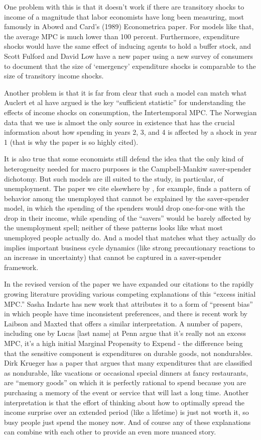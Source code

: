 \documentclass[12pt,letterpaper,english]{article}
\begin{document}
\begin{enumerate}
One problem with this is that it doesn't work if there are transitory shocks to income of a magnitude that labor economists have long been measuring, most famously in Abowd and Card's (1989) Econometrica paper.  For models like that, the average MPC is much lower than 100 percent.  Furthermore, expenditure shocks would have the same effect of inducing agents to hold a buffer stock, and Scott Fulford and David Low have a new paper using a new survey of consumers to document that the size of `emergency' expenditure shocks is comparable to the size of transitory income shocks.

Another problem is that it is far from clear that such a model can match what Auclert et al have argued is the key ``sufficient statistic'' for understanding the effects of income shocks on consumption, the Intertemporal MPC.  The Norwegian data that we use is almost the only source in existence that has the crucial information about how spending in years 2, 3, and 4 is affected by a shock in year 1 (that is why the paper is so highly cited). 

It is also true that some economists still defend the idea that the only kind of heterogeneity needed for macro purposes is the Campbell-Mankiw saver-spender dichotomy. But such models are ill suited to the study, in particular, of unemployment.  The paper we cite elsewhere by , for example, finds a pattern of behavior among the unemployed that cannot be explained by the saver-spender model, in which the spending of the spenders would drop one-for-one with the drop in their income, while spending of the ``savers'' would be barely affected by the unemployment spell; neither of these patterns looks like what most unemployed people actually do.  And a model that matches what they actually do implies important business cycle dynamics (like strong precautionary reactions to an increase in uncertainty) that cannot be captured in a saver-spender framework.

In the revised version of the paper we have expanded our citations to the rapidly growing literature providing various competing explanations of this ``excess initial MPC.'' Sasha Indarte has new work that attributes it to a form of ``present bias'' in which people have time inconsistent preferences, and there is recent work by Laibson and Maxted that offers a similar interpretation. A number of papers, including one by Lucas [last name] at Penn argue that it's really not an excess MPC, it's a high initial Marginal Propensity to Expend - the difference being that the sensitive component is expenditures on durable goods, not nondurables. Dirk Krueger has a paper that argues that many expenditures that are classified as nondurable, like vacations or occasional special dinners at fancy restaurants, are ``memory goods'' on which it is perfectly rational to spend because you are purchasing a memory of the event or service that will last a long time.  Another interpretation is that the effort of thinking about how to optimally spread the income surprise over an extended period (like a lifetime) is just not worth it, so busy people just spend the money now. And of course any of these explanations can combine with each other to provide an even more nuanced story.


\end{enumerate}
\end{document}
